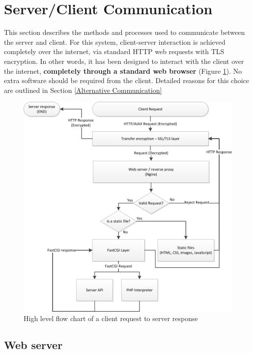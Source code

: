 

\section{Server/Client Communication}\label{Communications}


This section describes the methods and processes used to communicate between the server and client. For this system, client-server interaction is achieved completely over the internet, via standard HTTP web requests with TLS encryption. In other words, it has been designed to interact with the client over the internet, {\bf completely through a standard web browser} (Figure \ref{client_request_flowchart.png}). No extra software should be required from the client. Detailed reasons for this choice are outlined in Section \ref{Alternative Communication}

\begin{figure}[H]
	\centering
	\includegraphics[width=1.1\textwidth]{figures/client_request_flowchart.png}
	\caption{High level flow chart of a client request to server response} 
	\label{client_request_flowchart.png}
\end{figure}

\subsection{Web server}

